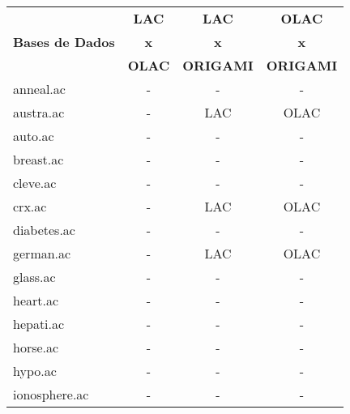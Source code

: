 \begin{table}[htbp]
	\centering
		\renewcommand{\tabcolsep}{1.8mm}
		\begin{tabular}{|l|c|c|c|}
		\hline
					& \textbf{LAC}		& \textbf{LAC}		& \textbf{OLAC}		\\
		\textbf{Bases de Dados}	& \textbf{x}		& \textbf{x}		& \textbf{x}		\\
					& \textbf{OLAC}		& \textbf{ORIGAMI}	& \textbf{ORIGAMI}	\\
		\hline
		anneal.ac               & -                     & -                     & -                     \\
		\hline
		austra.ac               & -                     & LAC                   & OLAC                  \\
		\hline
		auto.ac                 & -                     & -                     & -                     \\
		\hline
		breast.ac               & -                     & -                     & -                     \\
		\hline
		cleve.ac                & -                     & -                     & -                     \\
		\hline
		crx.ac                  & -                     & LAC                   & OLAC                  \\
		\hline
		diabetes.ac             & -                     & -                     & -                     \\
		\hline
		german.ac               & -                     & LAC                   & OLAC                  \\
		\hline
		glass.ac                & -                     & -                     & -                     \\
		\hline
		heart.ac                & -                     & -                     & -                     \\
		\hline
		hepati.ac               & -                     & -                     & -                     \\
		\hline
		horse.ac                & -                     & -                     & -                     \\
		\hline
		hypo.ac                 & -                     & -                     & -                     \\
		\hline
		ionosphere.ac           & -                     & -                     & -                     \\
		\hline

\end{tabular}
\end{table}
